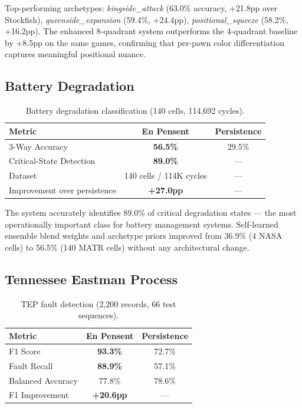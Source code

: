 \documentclass[11pt,a4paper]{article}
\begin{document}
Top-performing archetypes: \emph{kingside\_attack} (63.0\% accuracy, +21.8pp over
Stockfish), \emph{queenside\_expansion} (59.4\%, +24.4pp), \emph{positional\_squeeze}
(58.2\%, +16.2pp). The enhanced 8-quadrant system outperforms the 4-quadrant baseline
by +8.5pp on the same games, confirming that per-pawn color differentiation captures
meaningful positional nuance.

\subsection{Battery Degradation}

\begin{table}[h]
\centering
\caption{Battery degradation classification (140 cells, 114,692 cycles).}
\label{tab:battery}
\begin{tabular}{lcc}
\toprule
\textbf{Metric} & \textbf{En Pensent} & \textbf{Persistence} \\
\midrule
3-Way Accuracy               & \textbf{56.5\%} & 29.5\% \\
Critical-State Detection     & \textbf{89.0\%} & --- \\
Dataset                      & 140 cells / 114K cycles & --- \\
Improvement over persistence & \textbf{+27.0pp} & --- \\
\bottomrule
\end{tabular}
\end{table}

The system accurately identifies 89.0\% of critical degradation states --- the most
operationally important class for battery management systems. Self-learned ensemble
blend weights and archetype priors improved from 36.9\% (4 NASA cells) to 56.5\%
(140 MATR cells) without any architectural change.

\subsection{Tennessee Eastman Process}

\begin{table}[h]
\centering
\caption{TEP fault detection (2,200 records, 66 test sequences).}
\label{tab:tep}
\begin{tabular}{lcc}
\toprule
\textbf{Metric} & \textbf{En Pensent} & \textbf{Persistence} \\
\midrule
F1 Score           & \textbf{93.3\%} & 72.7\% \\
Fault Recall       & \textbf{88.9\%} & 57.1\% \\
Balanced Accuracy  & 77.8\%          & 78.6\% \\
F1 Improvement     & \textbf{+20.6pp} & --- \\
\bottomrule
\end{tabular}
\end{table}
\end{document}
